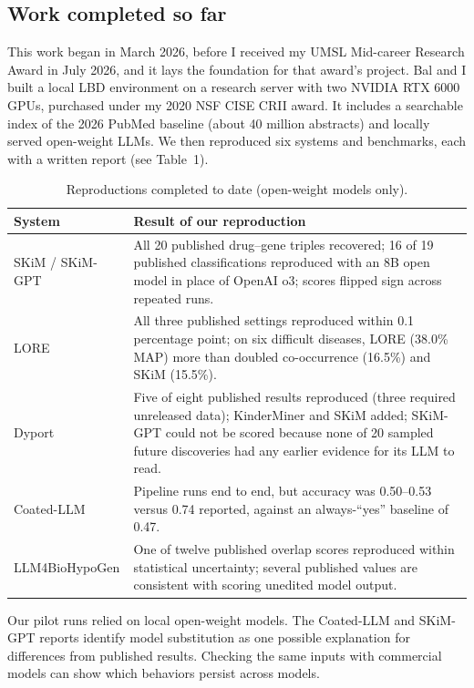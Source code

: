 \documentclass[11pt]{article}
\begin{document}
\subsection*{Work completed so far}

This work began in March 2026, before I received my UMSL Mid-career Research Award in July 2026, and it lays the foundation for that award's project. Bal and I built a local LBD environment on a research server with two NVIDIA RTX 6000 GPUs, purchased under my 2020 NSF CISE CRII award. It includes a searchable index of the 2026 PubMed baseline (about 40 million abstracts) and locally served open-weight LLMs. We then reproduced six systems and benchmarks, each with a written report (see Table~1).

\begin{table}[h]
\centering\small
\caption{Reproductions completed to date (open-weight models only).}
\begin{tabularx}{\textwidth}{@{}lX@{}}
\toprule
System & Result of our reproduction \\
\midrule
SKiM / SKiM-GPT & All 20 published drug--gene triples recovered; 16 of 19 published classifications reproduced with an 8B open model in place of OpenAI o3; scores flipped sign across repeated runs. \\
LORE & All three published settings reproduced within 0.1 percentage point; on six difficult diseases, LORE (38.0\% MAP) more than doubled co-occurrence (16.5\%) and SKiM (15.5\%). \\
Dyport & Five of eight published results reproduced (three required unreleased data); KinderMiner and SKiM added; SKiM-GPT could not be scored because none of 20 sampled future discoveries had any earlier evidence for its LLM to read. \\
Coated-LLM & Pipeline runs end to end, but accuracy was 0.50--0.53 versus 0.74 reported, against an always-``yes'' baseline of 0.47. \\
LLM4BioHypoGen & One of twelve published overlap scores reproduced within statistical uncertainty; several published values are consistent with scoring unedited model output. \\
\bottomrule
\end{tabularx}
\end{table}

Our pilot runs relied on local open-weight models. The Coated-LLM and SKiM-GPT reports identify model substitution as one possible explanation for differences from published results. Checking the same inputs with commercial models can show which behaviors persist across models.
\end{document}
